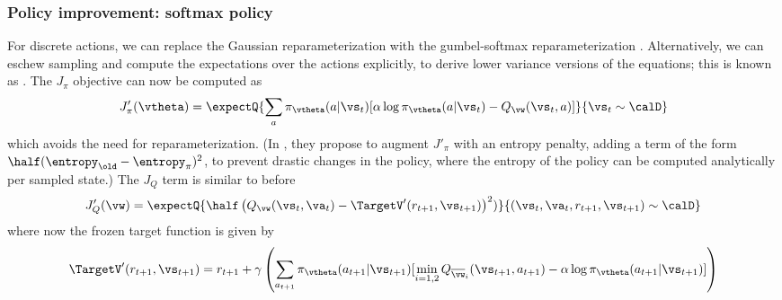   
\subsubsection{Policy improvement: softmax policy}
\label{sec:SACdiscrete}

  
For discrete actions,  we can replace the Gaussian
reparameterization with the gumbel-softmax reparameterization
\citep{Jang2016,concrete}.
Alternatively, we can eschew sampling
and compute the expectations over the actions explicitly,
to derive lower variance versions
of the equations;
this is known as 
\citep{Christodoulou2019}.
The  $J_{\pi}$ objective can now be computed as
\begin{align}
  J'_{\pi}(\vtheta)
  = \expectQ{\sum_a \pi_{\vtheta}(a|\vs_t)
    [\alpha \log \pi_{\vtheta}(a|\vs_t) - Q_{\vw}(\vs_t,a)]
    }{\vs_t \sim \calD}
\end{align}
which avoids the need for reparameterization.
(In  \citep{Zhou2022sac},
they  propose to augment $J'_{\pi}$ with an entropy penalty,
adding a term of the form $\half(\entropy_{\old}-\entropy_{\pi})^2$,
to prevent drastic changes in the policy,
where the entropy of the policy
can be computed analytically per sampled state.)
The $J_Q$ term is similar to before
\begin{align}
 J'_Q(\vw) = \expectQ{
   \half\left(
   Q_{\vw}(\vs_t,\va_t) - \TargetV'(r_{t+1}, \vs_{t+1})
   \right)^2)
 }{(\vs_t,\va_t,r_{t+1},\vs_{t+1}) \sim \calD}
\end{align}
where  now the frozen target
function is given by
\begin{align}
  \TargetV'(r_{t+1},\vs_{t+1})
   = r_{t+1} + \gamma \left(
    \sum_{a_{t+1}} \pi_{\vtheta}(a_{t+1}|\vs_{t+1})
      [\min_{i=1,2} Q_{\overline{\vw}_i}(\vs_{t+1},a_{t+1}) - \alpha \log \pi_{\vtheta}(a_{t+1}|\vs_{t+1})]
      \right)
  \end{align}


